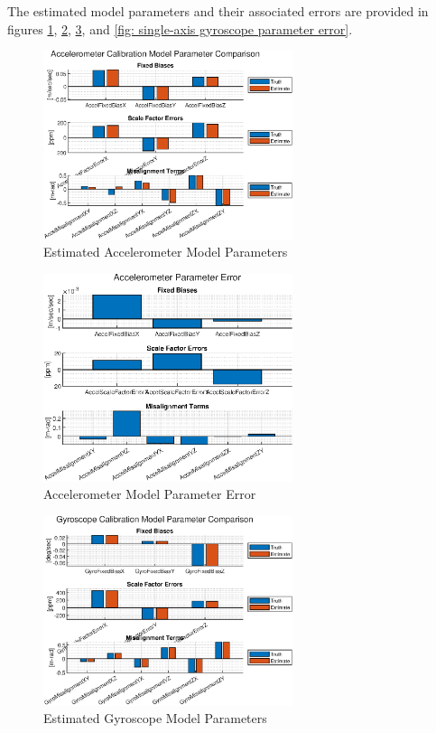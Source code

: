 The estimated model parameters and their associated errors are provided in figures \ref{fig: single-axis accelerometer parameters}, \ref{fig: single-axis accelerometer parameter error}, \ref{fig: single-axis gyroscope parameters}, and \ref{fig: single-axis gyroscope parameter error}. 

\begin{figure}[h] 
	\centering
	\includegraphics[width=0.65\textwidth]{./images/SAM_accel_model_parameters.eps}
	\caption{Estimated Accelerometer Model Parameters}
	\label{fig: single-axis accelerometer parameters}
\end{figure}
\FloatBarrier

\begin{figure}[h] 
	\centering
	\includegraphics[width=0.65\textwidth]{./images/SAM_accel_model_error.eps}
	\caption{Accelerometer Model Parameter Error}
	\label{fig: single-axis accelerometer parameter error}
\end{figure}
\FloatBarrier

\begin{figure}[h] 
	\centering
	\includegraphics[width=0.65\textwidth]{./images/SAM_gyro_model_parameters.eps}
	\caption{Estimated Gyroscope Model Parameters}
	\label{fig: single-axis gyroscope parameters}
\end{figure}
\FloatBarrier

